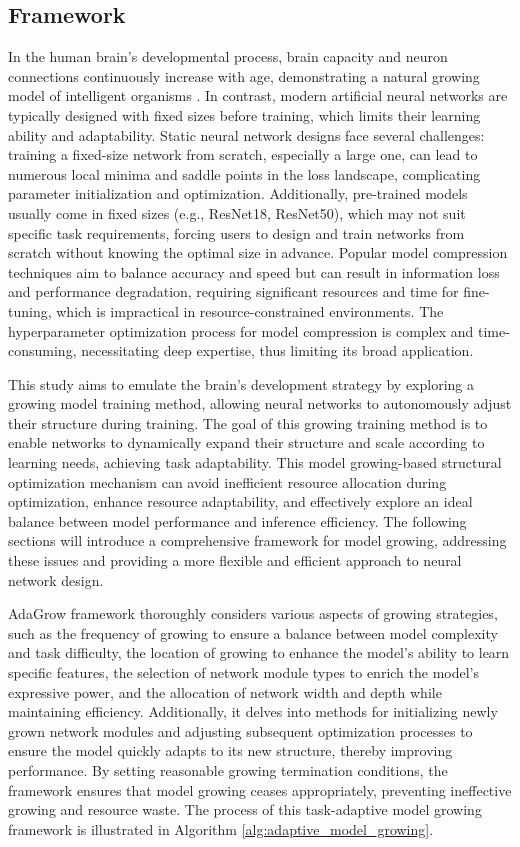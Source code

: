 \documentclass[preprint,12pt]{elsarticle}
\begin{document}
\subsection{Framework}

In the human brain's developmental process, brain capacity and neuron connections continuously increase with age, demonstrating a natural growing model of intelligent organisms \cite{brain}. In contrast, modern artificial neural networks are typically designed with fixed sizes before training, which limits their learning ability and adaptability. Static neural network designs face several challenges: training a fixed-size network from scratch, especially a large one, can lead to numerous local minima and saddle points in the loss landscape, complicating parameter initialization and optimization. Additionally, pre-trained models usually come in fixed sizes (e.g., ResNet18, ResNet50), which may not suit specific task requirements, forcing users to design and train networks from scratch without knowing the optimal size in advance. Popular model compression techniques aim to balance accuracy and speed but can result in information loss and performance degradation, requiring significant resources and time for fine-tuning, which is impractical in resource-constrained environments. The hyperparameter optimization process for model compression is complex and time-consuming, necessitating deep expertise, thus limiting its broad application.

This study aims to emulate the brain's development strategy by exploring a growing model training method, allowing neural networks to autonomously adjust their structure during training. The goal of this growing training method is to enable networks to dynamically expand their structure and scale according to learning needs, achieving task adaptability. This model growing-based structural optimization mechanism can avoid inefficient resource allocation during optimization, enhance resource adaptability, and effectively explore an ideal balance between model performance and inference efficiency. The following sections will introduce a comprehensive framework for model growing, addressing these issues and providing a more flexible and efficient approach to neural network design.

AdaGrow framework thoroughly considers various aspects of growing strategies, such as the frequency of growing to ensure a balance between model complexity and task difficulty, the location of growing to enhance the model's ability to learn specific features, the selection of network module types to enrich the model's expressive power, and the allocation of network width and depth while maintaining efficiency. Additionally, it delves into methods for initializing newly grown network modules and adjusting subsequent optimization processes to ensure the model quickly adapts to its new structure, thereby improving performance. By setting reasonable growing termination conditions, the framework ensures that model growing ceases appropriately, preventing ineffective growing and resource waste. The process of this task-adaptive model growing framework is illustrated in Algorithm \ref{alg:adaptive_model_growing}.
\end{document}
